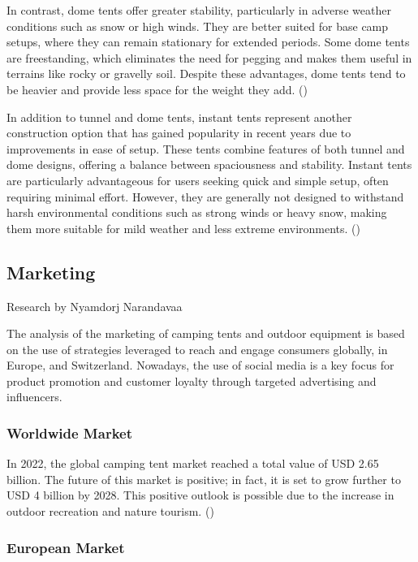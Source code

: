 \documentclass{article}
\begin{document}
In contrast, dome tents offer greater stability, particularly in adverse weather conditions
such as snow or high winds. They are better suited for base camp setups, where they can
remain stationary for extended periods. Some dome tents are freestanding, which eliminates
the need for pegging and makes them useful in terrains like rocky or gravelly soil. Despite
these advantages, dome tents tend to be heavier and provide less space for the weight they
add. (\cite{setup2})

In addition to tunnel and dome tents, instant tents represent another construction option
that has gained popularity in recent years due to improvements in ease of setup. These
tents combine features of both tunnel and dome designs, offering a balance between
spaciousness and stability. Instant tents are particularly advantageous for users seeking
quick and simple setup, often requiring minimal effort. However, they are generally not
designed to withstand harsh environmental conditions such as strong winds or heavy snow,
making them more suitable for mild weather and less extreme environments.
(\cite{outdoorlife2024})

\subsection{Marketing}
{\small Research by Nyamdorj Narandavaa}

The analysis of the marketing of camping tents and outdoor equipment is based on the use
of strategies leveraged to reach and engage consumers globally, in Europe, and Switzerland.
Nowadays, the use of social media is a key focus for product promotion and customer loyalty
through targeted advertising and influencers.

\subsubsection{Worldwide Market}

In 2022, the global camping tent market reached a total value of USD 2.65 billion. The
future of this market is positive; in fact, it is set to grow further to USD 4 billion by
2028. This positive outlook is possible due to the increase in outdoor recreation and
nature tourism. (\cite{expert2023})

\subsubsection{European Market}
\end{document}
